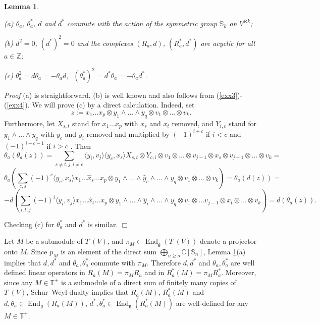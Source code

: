 \documentclass[11pt]{amsart}
\newcounter{theorem}
\newtheorem{lemma}[theo]{Lemma}
\renewenvironment{proof}{ \emph{Proof}}{$\Box$}
\renewcommand{\gg}{\mathfrak{g}}
\begin{document}
\begin{lemma}\label{mainproperties}

(a) $\theta_a$, $\theta_a^*$, $d$ and $d^*$ commute with the action of the symmetric
  group $\mathbb S_k$ on $V^{\otimes k}$;

(b) $d^2=0$, $(d^*)^2=0$ and the complexes $(R_a,d)$,  $(R_a^*,d^*)$ are acyclic for
  all $a\in\mathbb Z$;

(c) $\theta_a^2=d\theta_a=-\theta_a d,\;\;(\theta_a^*)^2=d^*\theta_a=-\theta_a d^*$.
\end{lemma}
\begin{proof} (a) is straightforward, (b) is well known and also follows from (\ref{exx3})-(\ref{exx4}).
We will prove (c) by a direct calculation. Indeed, set
$$z:=x_1\dots x_p \otimes y_1\wedge\dots\wedge y_q\otimes v_1\otimes\dots\otimes v_k.$$
Furthermore, let $X_{s,t}$ stand for $x_1\dots x_p$ with $x_s$ and
$x_t$ removed, and $Y_{i,c}$ stand for $y_1\wedge\dots\wedge y_q$ with $y_c$
and $y_i$ removed and multiplied by $(-1)^{i+c}$ if $i<c$ and  $(-1)^{i+c-1}$ if $i>c$ .
Then 
$$\theta_a(\theta_a(z))=\sum_{s\neq t, j,i\neq c}\langle y_i,v_j\rangle\langle y_c,x_s\rangle X_{s,t}\otimes Y_{c,i}\otimes
v_1\otimes\dots\otimes v_{j-1}\otimes x_s\otimes v_{j+1}\otimes\dots\otimes v_k=$$
$$\theta_a\left(\sum_{c,s}(-1)^c \langle y_c,x_s\rangle x_1\dots \hat x_s\dots x_p\otimes y_1\wedge\dots\wedge\hat y_c\wedge\dots\wedge
y_q\otimes v_1\otimes\dots\otimes v_k\right)=\theta_a(d(z))=$$
$$-d\left(\sum_{i,t,j}(-1)^i \langle y_i,v_j\rangle x_1\dots \hat x_t\dots x_p\otimes y_1\wedge\dots\wedge\hat y_i\wedge\dots\wedge
y_q\otimes v_1\otimes\dots v_{j-1}\otimes x_t\otimes\dots\otimes v_k\right)=d(\theta_a(z)).$$

Checking (c) for $\theta_a^*$ and $d^*$ is similar.
\end{proof}

Let $M$ be a submodule of $T^\cdot(V)$, and $\pi_M\in\operatorname{End}_{\gg}(T^\cdot(V))$
denote a projector onto $M$.
Since $p_M$ is an element of the direct sum $\bigoplus_{n\geq o}\mathbb C[\mathbb S_n]$, Lemma \ref{mainproperties}(a) implies that 
$d, d^*$ and $\theta_a,\theta_a^*$ commute
with $\pi_M$. Therefore $d, d^*$ and $\theta_a,\theta_a^*$ 
are well defined linear operators in $R_a(M)=\pi_M R_a$ and in  $R^*_a(M)=\pi_M R^*_a$. Moreover, since any 
$M\in\mathbb T^+$ is a submodule of a direct sum of finitely many
copies of $T^\cdot(V)$, Schur--Weyl dualty implies that
$R_a(M)$, $R^*_a(M)$ and  
$d,\theta_a\in\operatorname{End}_\gg(R_a(M))$, $d^*,\theta_a^*\in \operatorname{End}_\gg(R^*_a(M))$
are well-defined for any $M\in\mathbb T^+$. 
\end{document}
